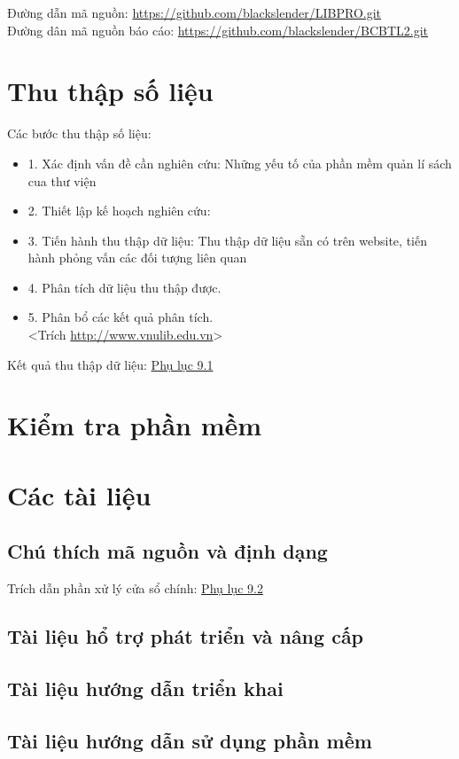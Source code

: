 \documentclass[a4paper]{article}
\begin{document}
Đường dẫn mã nguồn: \url{https://github.com/blackslender/LIBPRO.git}\\
Đường dân mã nguồn báo cáo: \url{https://github.com/blackslender/BCBTL2.git}\\
\section{Thu thập số liệu}
Các bước thu thập số liệu:\\
\begin{itemize}
\item 1. Xác định vấn đề cần nghiên cứu: Những yếu tố của phần mềm quản lí sách cua thư viện
\item 2. Thiết lập kế hoạch nghiên cứu:
\item 3. Tiến hành thu thập dữ liệu: Thu thập dữ liệu sẵn có trên website, tiến hành phỏng vấn các đối tượng liên quan
\item 4. Phân tích dữ liệu thu thập được.
\item 5. Phân bổ các kết quả phân tích.\\
<Trích \url{http://www.vnulib.edu.vn}>
\end{itemize}
Kết quả thu thập dữ liệu: \hyperref[sec:tailieu]{Phụ lục 9.1}\\
\section{Kiểm tra phần mềm}

\section{Các tài liệu}
\subsection{Chú thích mã nguồn và định dạng}
Trích dẫn phần xử lý cửa sổ chính: \hyperref[sec:trichcode]{Phụ lục 9.2}\\
\subsection{Tài liệu hổ trợ phát triển và nâng cấp}
\subsection{Tài liệu hướng dẫn triển khai}
\subsection{Tài liệu hướng dẫn sử dụng phần mềm}
\end{document}
